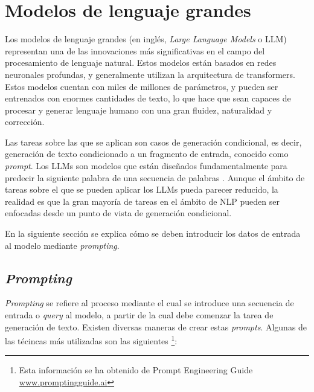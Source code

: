 \documentclass[11pt,spanish,listoffigures,listoftables]{tfgetsinf}
\begin{document}
\section{Modelos de lenguaje grandes} \label{modelosLenguajeGrandes}

Los modelos de lenguaje grandes (en inglés, \textit{Large Language Models} o LLM) representan una de las innovaciones más significativas en el campo del procesamiento de lenguaje natural. Estos modelos están basados en redes neuronales profundas, y generalmente utilizan la arquitectura de transformers. Estos modelos cuentan con miles de millones de parámetros, y pueden ser entrenados con enormes cantidades de texto, lo que hace que sean capaces de procesar y generar lenguaje humano con una gran fluidez, naturalidad y corrección.

Las tareas sobre las que se aplican son casos de generación condicional, es decir, generación de texto condicionado a un fragmento de entrada, conocido como \textit{prompt}. Los LLMs son modelos que están diseñados fundamentalmente para predecir la siguiente palabra de una secuencia de palabras \cite{jurafsky2023speech}. Aunque el ámbito de tareas sobre el que se pueden aplicar los LLMs pueda parecer reducido, la realidad es que la gran mayoría de tareas en el ámbito de NLP pueden ser enfocadas desde un punto de vista de generación condicional.

En la siguiente sección se explica cómo se deben introducir los datos de entrada al modelo mediante \textit{prompting}.

\subsection{\textit{Prompting}}

\textit{Prompting} se refiere al proceso mediante el cual se introduce una secuencia de entrada o \textit{query} al modelo, a partir de la cual debe comenzar la tarea de generación de texto. Existen diversas maneras de crear estas \textit{prompts}. Algunas de las técincas más utilizadas son las siguientes \footnote{Esta  información se ha obtenido de Prompt Engineering Guide \url{www.promptingguide.ai}}:
\end{document}
